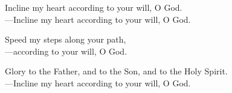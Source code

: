 \responsory

\noindent Incline my heart according to your will, O God.\\
{\color{red}---\thinspace}Incline my heart according to your will, O God.

\medskip\noindent Speed my steps along your path,\\
{\color{red}---\thinspace}according to your will, O God.

\medskip\noindent Glory to the Father, and to the Son, and to the Holy Spirit.\\
{\color{red}---\thinspace}Incline my heart according to your will, O God.